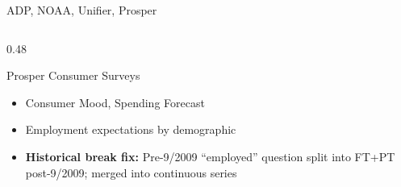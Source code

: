 \documentclass[aspectratio=169,10pt]{beamer}
\begin{document}
\begin{frame}{ADP, NOAA, Unifier, Prosper}
\begin{columns}[T]
\begin{column}{0.48\textwidth}
\vspace{0.15cm}
\begin{block}{Prosper Consumer Surveys}
\footnotesize
\begin{itemize}
  \item Consumer Mood, Spending Forecast
  \item Employment expectations by demographic
  \item \textbf{Historical break fix:} Pre-9/2009 ``employed'' question split into FT+PT post-9/2009; merged into continuous series
\end{itemize}
\end{block}
\end{column}
\end{columns}
\end{frame}

\end{document}
